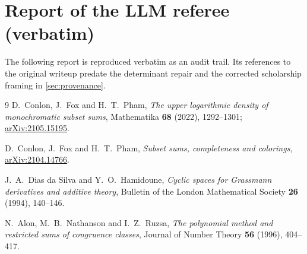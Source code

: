 \documentclass[11pt,a4paper]{article}
\theoremstyle{plain}
\theoremstyle{definition}
\theoremstyle{remark}
\begin{document}
\section{Report of the LLM referee (verbatim)}\label{app:referee}
\begin{tcolorbox}[colback=black!4,colframe=black!35,title={Status of this appendix}]
The following report is reproduced verbatim as an audit trail. Its
references to the original writeup predate the determinant repair and
the corrected scholarship framing in \cref{sec:provenance}.
\end{tcolorbox}


\begin{thebibliography}{9}
D.~Conlon, J.~Fox and H.~T.~Pham,
\emph{The upper logarithmic density of monochromatic subset sums},
Mathematika \textbf{68} (2022), 1292--1301;
\href{https://arxiv.org/abs/2105.15195}{arXiv:2105.15195}.

D.~Conlon, J.~Fox and H.~T.~Pham,
\emph{Subset sums, completeness and colorings},
\href{https://arxiv.org/abs/2104.14766}{arXiv:2104.14766}.

J.~A.~Dias da Silva and Y.~O.~Hamidoune,
\emph{Cyclic spaces for Grassmann derivatives and additive theory},
Bulletin of the London Mathematical Society \textbf{26} (1994), 140--146.

N.~Alon, M.~B.~Nathanson and I.~Z.~Ruzsa,
\emph{The polynomial method and restricted sums of congruence classes},
Journal of Number Theory \textbf{56} (1996), 404--417.
\end{thebibliography}
\end{document}
